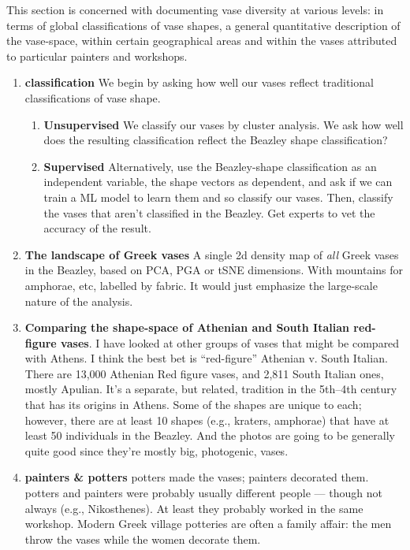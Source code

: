 \documentclass[onecolumn,10pt]{article}
\begin{document}
This section is concerned with documenting vase diversity at various levels:  in terms of global classifications of vase shapes, a general quantitative description of the vase-space, within certain geographical areas and within the vases attributed to particular painters and workshops. 

\begin{enumerate}
\item \textbf{classification} We begin by asking how well our vases reflect traditional classifications of vase shape.
\begin{enumerate}
    \item \textbf{Unsupervised} We classify our vases by cluster analysis.  We ask how well does the resulting classification reflect the Beazley shape classification?
    \item \textbf{Supervised} Alternatively, use the Beazley-shape classification as an independent variable, the shape vectors as dependent, and ask if we can train a ML model to learn them and so classify our vases.  Then, classify the vases that aren't classified in the Beazley. Get experts to vet the accuracy of the result.
\end{enumerate}
 

\item \textbf{The landscape of Greek vases} A single 2d density map of \emph{all} Greek vases in the Beazley, based on PCA, PGA or tSNE dimensions. With mountains for amphorae, etc, labelled by fabric. It would just emphasize the large-scale nature of the analysis.

\item \textbf{Comparing the shape-space of Athenian and South Italian red-figure vases}. I have looked at other groups of vases that might be compared with Athens. I think the best bet is ``red-figure'' Athenian v. South Italian. There are 13,000 Athenian Red figure vases, and 2,811 South Italian ones, mostly Apulian. It's a separate, but related, tradition in the 5th--4th century that has its origins in Athens. Some of the shapes are unique to each; however, there are at least 10 shapes (e.g., kraters, amphorae) that have at least 50 individuals in the Beazley. And the photos are going to be generally quite good since they're mostly big, photogenic, vases.  

\item \textbf{painters \& potters} potters made the vases; painters decorated them.  potters and painters were probably usually different people --- though not always (e.g., Nikosthenes). At least they probably worked in the same workshop. Modern Greek village potteries are often a family affair: the men throw the vases while the women decorate them.


\end{enumerate}
\end{document}
